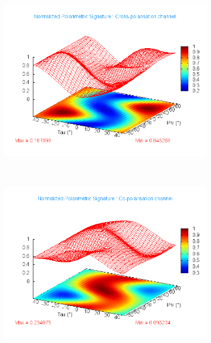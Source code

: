 \begin{figure}
\centering
\begin{subfigure}[t]{0.45\columnwidth}
\includegraphics[width=\columnwidth]{Figures/SnowCover2018/Sig/CopolSignature_1085_492_Snow}
\caption{}
\end{subfigure}
~
\begin{subfigure}[t]{0.45\columnwidth}
\includegraphics[width=\columnwidth]{Figures/SnowCover2018/Sig/XpolSignature_1085_492_Snow}
\caption{}
\end{subfigure}
~
\begin{subfigure}[t]{0.45\columnwidth}

\end{subfigure}
\end{figure}
